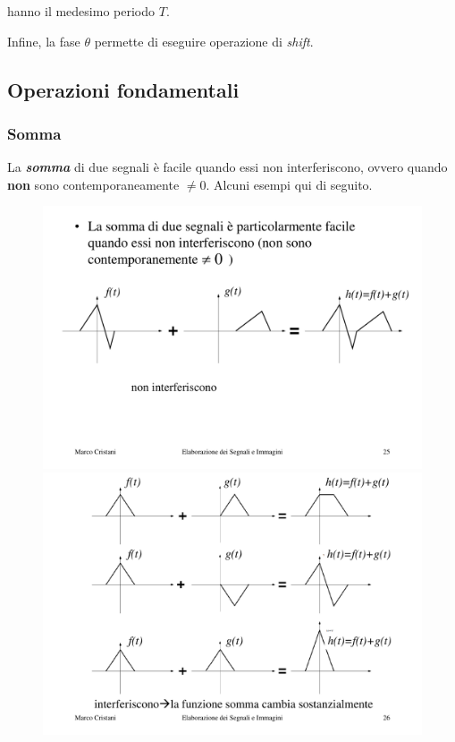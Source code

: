\documentclass[a4paper]{article}
\begin{document}
	\noindent
	hanno il medesimo periodo $T$.
	
	\noindent
	Infine, la fase $\theta$ permette di eseguire operazione di \emph{shift}.
	
	\newpage
	
	\subsection{Operazioni fondamentali}
	
	\subsubsection{Somma}
	
	La \textbf{\emph{somma}} di due segnali è facile quando essi non interferiscono, ovvero quando \textbf{non} sono contemporaneamente $\ne 0$. Alcuni esempi qui di seguito.
	
	\begin{figure}[!htp]
		\centering
		\includegraphics[width=1\textwidth]{img/op_somma_1.pdf}
		\includegraphics[width=1\textwidth]{img/op_somma_2.pdf}
	\end{figure}
\end{document}
